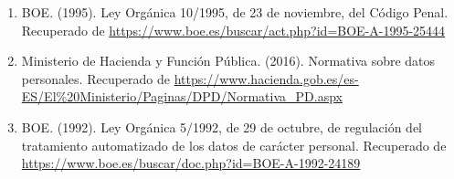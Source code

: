 \documentclass[11pt]{report}
\begin{document}
\begin{enumerate}
\item BOE. (1995). Ley Orgánica 10/1995, de 23 de noviembre, del Código Penal. Recuperado de \url{https://www.boe.es/buscar/act.php?id=BOE-A-1995-25444}

\item Ministerio de Hacienda y Función Pública. (2016). Normativa sobre datos personales. Recuperado de \url{https://www.hacienda.gob.es/es-ES/El%20Ministerio/Paginas/DPD/Normativa_PD.aspx}

\item BOE. (1992). Ley Orgánica 5/1992, de 29 de octubre, de regulación del tratamiento automatizado de los datos de carácter personal. Recuperado de \url{https://www.boe.es/buscar/doc.php?id=BOE-A-1992-24189}


\end{enumerate}
\end{document}
